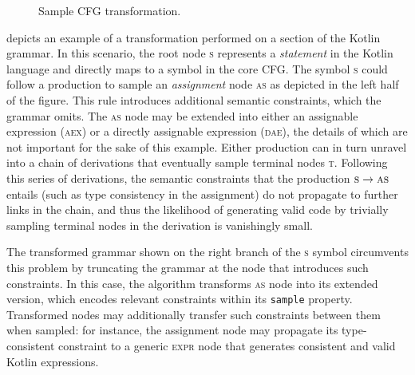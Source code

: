 \begin{figure}
    \centering
{}
 \caption{Sample \gls{CFG} transformation.}
    \label{fig:extended_cfg}
\end{figure}

 depicts an example of a transformation performed
on a section of the Kotlin grammar.
In this scenario, the root node \textsc{s} represents a \textit{statement} in the Kotlin
language and directly maps to a symbol in the core \gls{CFG}.
The symbol \textsc{s} could follow a production to sample an \textit{assignment}
node \textsc{as} as depicted in the left half of the figure.
This rule introduces additional semantic constraints, which the grammar omits.
The \textsc{as} node may be extended into either
an assignable expression (\textsc{aex}) or 
a directly assignable expression (\textsc{dae}), the details of which are
not important for the sake of this example.
Either production can in turn unravel into a chain of derivations that eventually
sample terminal nodes \textsc{t}.
Following this series of derivations, the semantic constraints that the production
$\textsc{s} \to \textsc{as}$ entails (such as type consistency in the assignment)
do not propagate to further links in the chain,
and thus the likelihood of generating
valid code by trivially sampling terminal nodes in the derivation
is vanishingly small.

The transformed grammar shown on the right branch of the \textsc{s} symbol circumvents
this problem by truncating the grammar at the node that introduces such constraints.
In this case, the algorithm transforms \textsc{as} node into its extended version,
which encodes relevant constraints within its \texttt{sample} property.
Transformed nodes may additionally transfer such constraints between them when sampled:
for instance, the assignment node may propagate its type-consistent constraint to a generic
\textsc{expr} node that generates consistent and valid Kotlin expressions.

